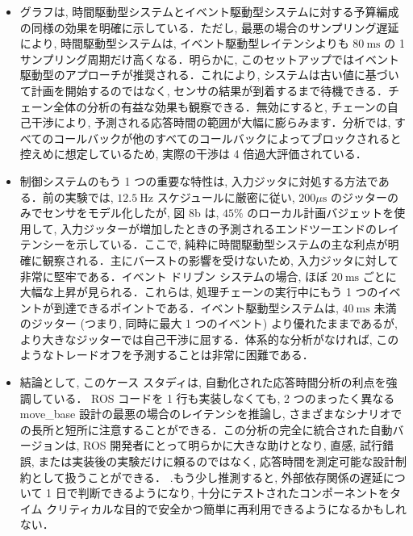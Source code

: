 \begin{frame}{}
    \begin{itemize}
        \item グラフは, 時間駆動型システムとイベント駆動型システムに対する予算編成の同様の効果を明確に示している．ただし, 最悪の場合のサンプリング遅延により, 時間駆動型システムは, イベント駆動型レイテンシよりも $80 \mathrm{~ms}$ の 1 サンプリング周期だけ高くなる．明らかに, このセットアップではイベント駆動型のアプローチが推奨される．これにより, システムは古い値に基づいて計画を開始するのではなく, センサの結果が到着するまで待機できる．チェーン全体の分析の有益な効果も観察できる．無効にすると, チェーンの自己干渉により, 予測される応答時間の範囲が大幅に膨らみます．分析では, すべてのコールバックが他のすべてのコールバックによってブロックされると控えめに想定しているため, 実際の干渉は 4 倍過大評価されている．
    \end{itemize}
\end{frame}

\begin{frame}{}
    \begin{itemize}
        \item 制御システムのもう 1 つの重要な特性は, 入力ジッタに対処する方法である．前の実験では, $12.5 \mathrm{~Hz}$ スケジュールに厳密に従い, $200 \mu \mathrm{s}$ のジッターのみでセンサをモデル化したが, 図 8b は, $45 \%$ のローカル計画バジェットを使用して, 入力ジッターが増加したときの予測されるエンドツーエンドのレイテンシーを示している．ここで, 純粋に時間駆動型システムの主な利点が明確に観察される．主にバーストの影響を受けないため, 入力ジッタに対して非常に堅牢である．イベント ドリブン システムの場合, ほぼ $20 \mathrm{~ms}$ ごとに大幅な上昇が見られる．これらは, 処理チェーンの実行中にもう 1 つのイベントが到達できるポイントである．イベント駆動型システムは, $40 \mathrm{~ms}$ 未満のジッター (つまり, 同時に最大 1 つのイベント) より優れたままであるが, より大きなジッターでは自己干渉に屈する．体系的な分析がなければ, このようなトレードオフを予測することは非常に困難である．
    \end{itemize}
\end{frame}

\begin{frame}{}
    \begin{itemize}
        \item 結論として, このケース スタディは, 自動化された応答時間分析の利点を強調している． ROS コードを 1 行も実装しなくても, 2 つのまったく異なる move\_base 設計の最悪の場合のレイテンシを推論し, さまざまなシナリオでの長所と短所に注意することができる．この分析の完全に統合された自動バージョンは, ROS 開発者にとって明らかに大きな助けとなり, 直感, 試行錯誤, または実装後の実験だけに頼るのではなく, 応答時間を測定可能な設計制約として扱うことができる． .もう少し推測すると, 外部依存関係の遅延について 1 日で判断できるようになり, 十分にテストされたコンポーネントをタイム クリティカルな目的で安全かつ簡単に再利用できるようになるかもしれない．
    \end{itemize}
\end{frame}
